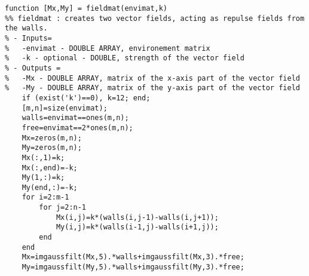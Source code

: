 {\small
\begin{lstlisting}[frame=single]
function [Mx,My] = fieldmat(envimat,k)
%% fieldmat : creates two vector fields, acting as repulse fields from the walls.
% - Inputs=
%   -envimat - DOUBLE ARRAY, environement matrix
%   -k - optional - DOUBLE, strength of the vector field
% - Outputs =
%   -Mx - DOUBLE ARRAY, matrix of the x-axis part of the vector field
%   -My - DOUBLE ARRAY, matrix of the y-axis part of the vector field
    if (exist('k')==0), k=12; end;
    [m,n]=size(envimat);
    walls=envimat==ones(m,n);
    free=envimat==2*ones(m,n);
    Mx=zeros(m,n);
    My=zeros(m,n);
    Mx(:,1)=k;
    Mx(:,end)=-k;
    My(1,:)=k;
    My(end,:)=-k;
    for i=2:m-1
        for j=2:n-1
            Mx(i,j)=k*(walls(i,j-1)-walls(i,j+1));
            My(i,j)=k*(walls(i-1,j)-walls(i+1,j));
        end
    end
    Mx=imgaussfilt(Mx,5).*walls+imgaussfilt(Mx,3).*free;
    My=imgaussfilt(My,5).*walls+imgaussfilt(My,3).*free;
\end{lstlisting}
}
